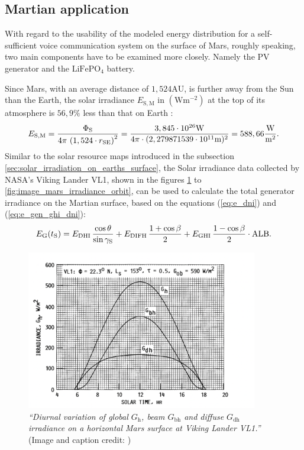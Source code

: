 \subsection{Martian application}
With regard to the usability of the modeled energy distribution for a self-sufficient voice communication system on the surface of Mars, roughly speaking, two main components have to be examined more closely. Namely the PV generator and the $\mathrm{LiFePO}_4$ battery.

Since Mars, with an average distance of $1,524\mathrm{AU}$, is further away from the Sun than the Earth, the solar irradiance $E_\mathrm{S,M}$ in $\left(\mathrm{Wm^{-2}}\right)$ at the top of its atmosphere is $56,9\%$ less than that on Earth \cite{Karttunen:2006}: 
\begin{equation} \label{eq:e_sun_mars}
	\centering
	E_{\mathrm{S,M}} = \frac{\Phi_{\mathrm{S}}}{4 \pi \, \left(1,524 \cdot r_{\mathrm{SE}}\right)^2} = \frac{3,845 \cdot 10^{26} \mathrm{W}}{4 \pi \cdot (2,279871539 \cdot 10^{11} \mathrm{m})^2} = 588,66 \frac{\mathrm{W}}{\mathrm{m}^2}\text{.}
\end{equation}
Similar to the solar resource maps introduced in the subsection \ref{sec:solar_irradiation_on_earths_surface}, the Solar irradiance data collected by NASA's Viking Lander VL1, shown in the figures \ref{fig:image_mars_irradiance_mean} to \ref{fig:image_mars_irradiance_orbit}, can be used to calculate the total generator irradiance on the Martian surface, based on the equations (\ref{eq:e_dni}) and (\ref{eq:e_gen_ghi_dni}):
\begin{equation} \label{eq:e_gen_ghi_dni_mars}
	\centering
		E_{\mathrm{G}}(t_\mathrm{S}) = E_{\mathrm{DHI}} \, \dfrac{\cos \theta}{\sin \gamma_\mathrm{S}} + E_{\mathrm{DIFH}} \,\frac{1 + \cos \beta }{2} + E_{\mathrm{GHI}} \, \frac{1 - \cos \beta }{2} \cdot \mathrm{ALB} \text{.}
\end{equation}
\begin{figure}[h!]
	\centering
  	\includegraphics[width = 0.9\textwidth]{images/image_mars_irradiance_mean}
  	\caption{\textit{``Diurnal variation of global $G_\mathrm{h}$, beam $G_\mathrm{bh}$ and diffuse $G_\mathrm{dh}$ irradiance on a horizontal Mars surface at Viking Lander VL1.''} (Image and caption credit: \cite{Appelbaum:1990})}
	\label{fig:image_mars_irradiance_mean}
\end{figure}
